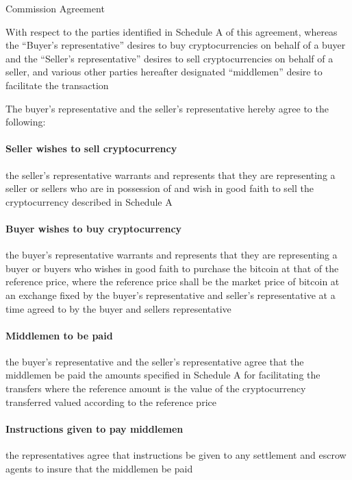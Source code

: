 \documentclass[10pt]{article}
\begin{document}
\begin{center}
{\Large Commission Agreement}
\end{center}

With respect to the parties identified in Schedule A of this
agreement, whereas the “Buyer’s representative” desires to buy
cryptocurrencies on behalf of a buyer and the “Seller’s
representative” desires to sell cryptocurrencies on behalf of a
seller, and various other parties hereafter designated “middlemen”
desire to facilitate the transaction

The buyer’s representative and the seller’s representative hereby
agree to the following:

\paragraph{Seller wishes to sell cryptocurrency} the seller’s
representative warrants and represents that they are representing a
seller or sellers who are in possession of and wish in good faith to
sell the cryptocurrency described in Schedule A

\paragraph{Buyer wishes to buy cryptocurrency} the buyer’s representative warrants and represents that they are representing a buyer or buyers who wishes in good faith to purchase the bitcoin at that  of the reference price, where the reference price shall be the market price of bitcoin at an exchange fixed by the buyer’s representative and seller’s representative at a time agreed to by the buyer and sellers representative

\paragraph{Middlemen to be paid} the buyer’s representative and the
seller's representative agree that the middlemen be paid the amounts
specified in Schedule A for facilitating the transfers where the
reference amount is the value of the cryptocurrency transferred valued
according to the reference price

\paragraph{Instructions given to pay middlemen} the
representatives agree that instructions be given to any settlement and
escrow agents to insure that the middlemen be paid
\end{document}
